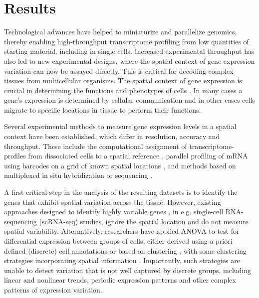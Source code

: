 \section{Results}

Technological advances have helped to miniaturize and parallelize genomics, thereby enabling high-throughput transcriptome profiling from low quantities of starting material, including in single cells. Increased experimental throughput has also led to new experimental designs, where the spatial context of gene expression variation can now be assayed directly. This is critical for decoding complex tissues from multicellular organisms. The spatial context of gene expression is crucial in determining the functions and phenotypes of cells \cite{Ledford2017-hq, Lee2017-om}. In many cases a gene’s expression is determined by cellular communication and in other cases cells migrate to specific locations in tissue to perform their functions.

Several experimental methods to measure gene expression levels in a spatial context have been established, which differ in resolution, accuracy and throughput. These include the computational assignment of transcriptome-profiles from dissociated cells to a spatial reference \cite{Achim2015-fe, Satija2015-lz}, parallel profiling of mRNA using barcodes on a grid of known spatial locations \cite{Junker2014-do, Chen2017-lg, Stahl2016-ym}, and methods based on multiplexed in situ hybridization \cite{Shah2016-bi, Moffitt2016-bi} or sequencing \cite{Ke2013-ek, Lee2014-ix, Lee2015-sz}.

A first critical step in the analysis of the resulting datasets is to identify the genes that exhibit spatial variation across the tissue. However, existing approaches designed to identify highly variable genes \cite{Brennecke2013-vv, Vallejos2015-fh}, in e.g. single-cell RNA-sequencing (scRNA-seq) studies, ignore the spatial location and do not measure spatial variability. Alternatively, researchers have applied ANOVA to test for differential expression between groups of cells, either derived using a priori defined (discrete) cell annotations or based on clustering \cite{Achim2015-fe, Satija2015-lz, Stahl2016-ym, Shah2016-bi, Ke2013-ek}, with some clustering strategies incorporating spatial information \cite{Pettit2014-pa}. Importantly, such strategies are unable to detect variation that is not well captured by discrete groups, including linear and nonlinear trends, periodic expression patterns and other complex patterns of expression variation. 

